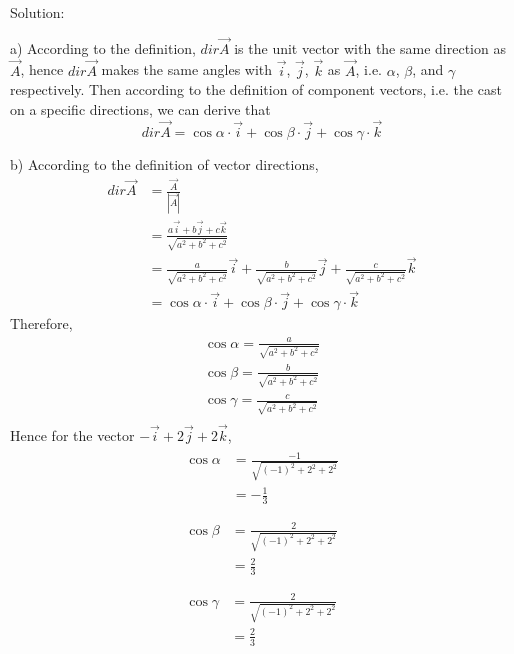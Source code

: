 \documentclass{article}
\begin{document}
Solution:

a) According to the definition, $dir \vec{A}$ is the unit vector with the same
direction as $\vec{A}$, hence $dir \vec{A}$ makes the same angles with
$\vec{i}$, $\vec{j}$, $\vec{k}$ as $\vec{A}$, i.e. $\alpha$, $\beta$, and 
$\gamma$ respectively. Then according to the definition of component vectors, 
i.e. the cast on a specific directions, we can derive that
\[
  dir \vec{A} = \cos\alpha \cdot \vec{i} + \cos\beta \cdot \vec{j} + \cos\gamma \cdot \vec{k}
\]

b) According to the definition of vector directions, 
\[
  \begin{split}
    dir \vec{A} &= \frac{\vec{A}}{|\vec{A}|} \\
                &= \frac{a \vec{i} + b \vec{j} + c \vec{k}}{\sqrt{a^2 + b^2 + c^2}} \\
                &= \frac{a}{\sqrt{a^2 + b^2 + c^2}} \vec{i} + \frac{b}{\sqrt{a^2 + b^2 + c^2}} \vec{j} + \frac{c}{\sqrt{a^2 + b^2 + c^2}} \vec{k} \\
                &= \cos\alpha \cdot \vec{i} + \cos\beta \cdot \vec{j} + \cos\gamma \cdot \vec{k}
  \end{split}
\]
Therefore,
\begin{gather*}
  \cos\alpha = \frac{a}{\sqrt{a^2 + b^2 + c^2}} \\
  \cos\beta = \frac{b}{\sqrt{a^2 + b^2 + c^2}} \\
  \cos\gamma = \frac{c}{\sqrt{a^2 + b^2 + c^2}} \\
\end{gather*}
Hence for the vector $-\vec{i} + 2\vec{j} + 2\vec{k}$,
\begin{gather*}
  \begin{split}
    \cos\alpha &= \frac{-1}{\sqrt{(-1)^2 + 2^2 + 2^2}} \\
               &= -\frac{1}{3} \\
  \end{split} \\
  \begin{split}
    \cos\beta &= \frac{2}{\sqrt{(-1)^2 + 2^2 + 2^2}} \\
              &= \frac{2}{3} \\
  \end{split} \\
  \begin{split}
    \cos\gamma &= \frac{2}{\sqrt{(-1)^2 + 2^2 + 2^2}} \\
              &= \frac{2}{3} \\
  \end{split} \\
\end{gather*}
\end{document}

